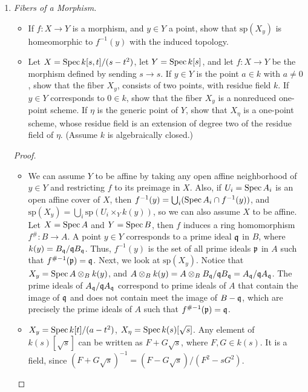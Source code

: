 \documentclass[a4paper]{article}
\begin{document}
\begin{enumerate} [label=\textbf{\arabic*.}, leftmargin=0em]
    \item[\textbf{10.}] \textit{Fibers of a Morphism.}
          \begin{itemize} [leftmargin=0cm]
              \item[(a)] If $f : X \to Y$ is a morphism, and $y \in Y$ a point, show that $\text{sp}(X_y)$ is homeomorphic to $f^{-1}(y)$ with the induced topology.
              \item[(b)] Let $X = \operatorname{Spec}{k[s, t] / (s - t^2)}$, let $Y = \operatorname{Spec}{k[s]}$, and let $f : X \to Y$ be the morphism defined by sending $s \to s$. If $y \in Y$ is the point $a \in k$ with $a \neq 0$, show that the fiber $X_y$, consists of two points, with residue field $k$. If $y \in Y$ corresponds to $0 \in k$, show that the fiber $X_y$ is a nonreduced one-point scheme. If $\eta$ is the generic point of $Y$, show that $X_\eta$ is a one-point scheme, whose residue field is an extension of degree two of the residue field of $\eta$. (Assume $k$ is algebraically closed.)
          \end{itemize}

          \begin{proof} $ $ \vspace{0pt}
              \begin{itemize} [leftmargin=0cm]
                  \item[(a)] We can assume $Y$ to be affine by taking any open affine neighborhood of $y \in Y$ and restricting $f$ to its preimage in $X$. Also, if $U_i = \operatorname{Spec}{A_i}$ is an open affine cover of $X$, then $f^{-1}(y) = \bigcup_i (\operatorname{Spec}{A_i} \cap f^{-1}(y))$, and $\text{sp}(X_y) = \bigcup_i \text{sp}(U_i \times_Y k(y))$, so we can also assume  $X$ to be affine. Let $X = \operatorname{Spec}{A}$ and $Y = \operatorname{Spec}{B}$, then $f$ induces a ring homomorphism $f^\# : B \to A$. A point $y \in Y$ corresponds to a prime ideal $\mathfrak{q}$ in $B$, where $k(y) = B_{\mathfrak{q}} / \mathfrak{q} B_{\mathfrak{q}}$. Thus, $f^{-1}(y)$ is the set of all prime ideals $\mathfrak{p}$ in $A$ such that $f^{\#-1}(\mathfrak{p}) = \mathfrak{q}$. Next, we look at $\text{sp}(X_y)$. Notice that $X_y = \operatorname{Spec}{A \otimes_B k(y)}$, and $A \otimes_B k(y) = A \otimes_B B_{\mathfrak{q}} / \mathfrak{q} B_{\mathfrak{q}} = A_{\mathfrak{q}} / \mathfrak{q} A_{\mathfrak{q}}$. The prime ideals of $A_{\mathfrak{q}} / \mathfrak{q} A_{\mathfrak{q}}$ correspond to prime ideals of $A$ that contain the image of $\mathfrak{q}$ and does not contain meet the image of $B - \mathfrak{q}$, which are precisely the prime ideals of $A$ such that $f^{\#-1}(\mathfrak{p}) = \mathfrak{q}$.

                  \item[(b)] $X_y = \operatorname{Spec}{k[t] / (a - t^2)}$, $X_\eta = \operatorname{Spec}{k(s)[\sqrt{s}]}$. Any element of $k(s)[\sqrt{s}]$ can be written as $F + G\sqrt{s}$, where $F, G \in k(s)$. It is a field, since $(F + G\sqrt{s})^{-1} = (F - G\sqrt{s}) / (F^2 - sG^2)$.
              \end{itemize}
          \end{proof}


\end{enumerate}
\end{document}
